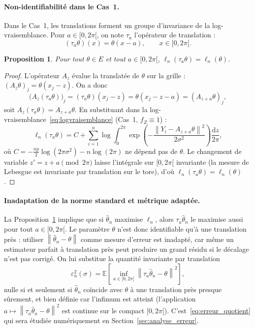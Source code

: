 \documentclass[12pt, a4paper]{article}
\newtheorem{proposition}[theorem]{Proposition}
\theoremstyle{definition}
\newcommand{\E}{\mathbb{E}}
\newcommand{\norm}[1]{\left\|#1\right\|}
\begin{document}
\paragraph{Non-identifiabilité dans le Cas~1.}
Dans le Cas~1, les translations forment un groupe d'invariance de la
log-vraisemblance. Pour $a \in [0, 2\pi[$, on note $\tau_a$ l'opérateur de
translation :
\[
    (\tau_a\theta)(x) = \theta(x - a), \qquad x \in [0, 2\pi[.
\]

\begin{proposition}
\label{prop:invariance_translation}
Pour tout $\theta \in E$ et tout $a \in [0, 2\pi[$,
$\ell_n(\tau_a\theta) = \ell_n(\theta)$.
\end{proposition}

\begin{proof}
L'opérateur $A_z$ évalue la translatée de $\theta$ sur la grille :
$(A_z\theta)_j = \theta(x_j - z)$. On a donc
\[
    \bigl(A_z(\tau_a\theta)\bigr)_j
    = (\tau_a\theta)(x_j - z)
    = \theta(x_j - z - a)
    = (A_{z+a}\theta)_j,
\]
soit $A_z(\tau_a\theta) = A_{z+a}\theta$. En substituant dans la
log-vraisemblance~\eqref{eq:logvraisemblance} (Cas~1, $f_Z \equiv 1$) :
\[
    \ell_n(\tau_a\theta)
    = C + \sum_{i=1}^{n} \log\!\int_0^{2\pi}
      \exp\!\left(-\frac{\norm{Y_i - A_{z+a}\theta}^2}{2\sigma^2}\right)
      \frac{\mathrm{d}z}{2\pi},
\]
où $C = -\frac{np}{2}\log(2\pi\sigma^2) - n\log(2\pi)$ ne dépend pas de $\theta$.
Le changement de variable $z' = z + a \pmod{2\pi}$ laisse l'intégrale sur
$[0, 2\pi[$ invariante (la mesure de Lebesgue est invariante par translation
sur le tore), d'où $\ell_n(\tau_a\theta) = \ell_n(\theta)$.
\end{proof}

\paragraph{Inadaptation de la norme standard et métrique adaptée.}
La Proposition~\ref{prop:invariance_translation} implique que si $\hat\theta_n$
maximise $\ell_n$, alors $\tau_a\hat\theta_n$ le maximise aussi pour tout
$a \in [0, 2\pi[$. Le paramètre $\theta$ n'est donc identifiable qu'à une
translation près : utiliser $\norm{\hat\theta_n - \theta}$ comme mesure
d'erreur est inadapté, car même un estimateur parfait à translation près
peut produire un grand résidu si le décalage n'est pas corrigé.
On lui substitue la quantité invariante par translation
\begin{equation}
    \varepsilon_n^2(\sigma)
    = \E\!\left[\inf_{a \in [0, 2\pi[} \norm{\tau_a\hat\theta_n - \theta}^2\right],
    \label{eq:erreur_quotient}
\end{equation}
nulle si et seulement si $\hat\theta_n$ coïncide avec $\theta$ à une translation
près presque sûrement, et bien définie car l'infimum est atteint
(l'application $a \mapsto \norm{\tau_a\hat\theta_n - \theta}^2$ est continue
sur le compact $[0, 2\pi[$).
C'est~\eqref{eq:erreur_quotient} qui sera étudiée numériquement en
Section~\ref{sec:analyse_erreur}.
\end{document}
